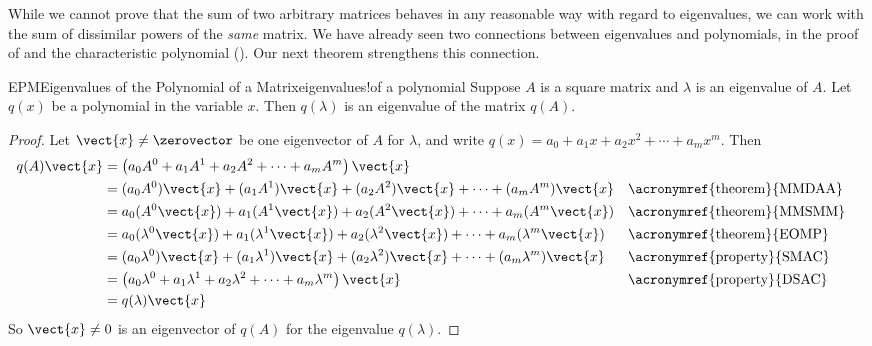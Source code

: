 %
While we cannot prove that the sum of two arbitrary matrices behaves in any reasonable way with regard to eigenvalues, we can work with the sum of dissimilar powers of the {\em same} matrix.  We have already seen two connections between eigenvalues and polynomials, in the proof of  and the characteristic polynomial ().  Our next theorem strengthens this connection.
%
\begin{theorem}{EPM}{Eigenvalues of the Polynomial of a Matrix}{eigenvalues!of a polynomial}
Suppose $A$ is a square matrix and $\lambda$ is an eigenvalue of $A$.  Let $q(x)$ be a polynomial in the variable $x$.  Then $q(\lambda)$ is an eigenvalue of the matrix $q(A)$.
\end{theorem}
%
\begin{proof}
%
Let $\vect{x}\neq\zerovector$ be one eigenvector of $A$ for $\lambda$, and write $q(x)=a_0+a_1x+a_2x^2+\cdots+a_mx^m$.  Then
%
\begin{align*}
q(A)\vect{x}&=\left(a_0A^0+a_1A^1+a_2A^2+\cdots+a_mA^m\right)\vect{x}\\
&=(a_0A^0)\vect{x}+(a_1A^1)\vect{x}+(a_2A^2)\vect{x}+\cdots+(a_mA^m)\vect{x}&&\text{\acronymref{theorem}{MMDAA}}\\
&=a_0(A^0\vect{x})+a_1(A^1\vect{x})+a_2(A^2\vect{x})+\cdots+a_m(A^m\vect{x})&&\text{\acronymref{theorem}{MMSMM}}\\
&=a_0(\lambda^0\vect{x})+a_1(\lambda^1\vect{x})+a_2(\lambda^2\vect{x})+\cdots+a_m(\lambda^m\vect{x})&&\text{\acronymref{theorem}{EOMP}}\\
&=(a_0\lambda^0)\vect{x}+(a_1\lambda^1)\vect{x}+(a_2\lambda^2)\vect{x}+\cdots+(a_m\lambda^m)\vect{x}&&\text{\acronymref{property}{SMAC}}\\
&=\left(a_0\lambda^0+a_1\lambda^1+a_2\lambda^2+\cdots+a_m\lambda^m\right)\vect{x}&&\text{\acronymref{property}{DSAC}}\\
&=q(\lambda)\vect{x}
%
\end{align*}
%
So $\vect{x}\neq 0$ is an eigenvector of $q(A)$ for the eigenvalue $q(\lambda)$.
%
\end{proof}
%
%
